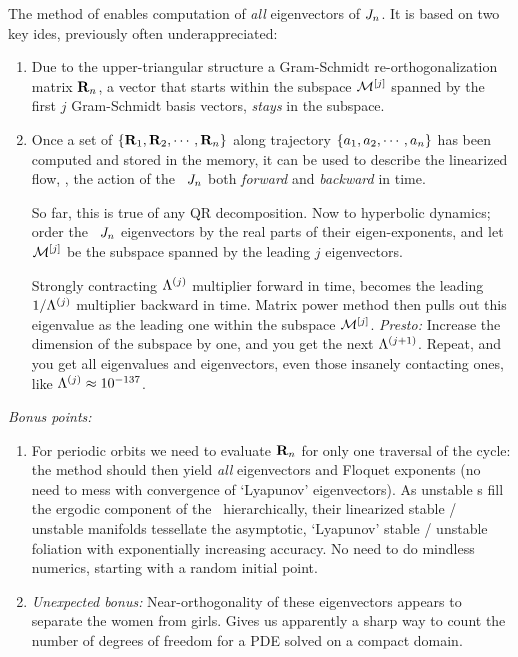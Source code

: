The method of  enables computation of
{\em all} eigenvectors of $J_n$. It is based on two key ides,
previously often underappreciated:
\begin{enumerate}
  \item
Due to the upper-triangular structure a Gram-Schmidt
  re-orthogonalization matrix ${\bf R}_n$, a vector that starts
  within the subspace ${\cal M}^{[j]}$ spanned by the first $j$ Gram-Schmidt
  basis vectors, {\em stays} in the subspace.
  \item
Once a set of $\{{\bf R}_1,{\bf R}_2,\cdots,{\bf R}_n\}$ along
trajectory $\{a_1,a_2,\cdots,a_n\}$ has been computed and
stored in the memory,
it can be used to describe the linearized flow,
\ie, the action of the \jacobianM\ $J_n$ both
\emph{forward} and \emph{backward} in time.

So far, this is true of any QR decomposition. Now to
hyperbolic dynamics; order the \jacobianM\ $J_n$
eigenvectors \jEigvec[\ell] by the real parts of their
eigen-exponents, and let ${\cal M}^{[j]}$ be the subspace spanned
by the leading $j$ eigenvectors.

Strongly contracting $\Lambda^{(j)}$ multiplier forward in time,
becomes the leading $1/\Lambda^{(j)}$ multiplier backward in time.
Matrix power method then pulls out this eigenvalue as the leading one
within the subspace ${\cal M}^{[j]}$. \emph{Presto:} Increase the dimension of the
subspace by one, and you get the next $\Lambda^{(j+1)}$. Repeat, and
you get all eigenvalues and eigenvectors, even those insanely contacting ones,
like $\Lambda^{(j)} \approx 10^{-137}$.

\end{enumerate}
\emph{Bonus points:}
\begin{enumerate}
  \item
For periodic orbits we need to evaluate ${\bf R}_n$
for only one traversal of the cycle: the method should then yield
{\em all} eigenvectors and Floquet exponents (no need to mess with
convergence of `Lyapunov' eigenvectors). As unstable \po s fill
the ergodic component of the \statesp\ hierarchically, their linearized
stable / unstable manifolds tessellate the asymptotic, `Lyapunov'
stable / unstable foliation with exponentially increasing accuracy.
No need to do mindless numerics, starting with a random initial point.

  \item
\emph{Unexpected bonus:}
Near-orthogonality of these eigenvectors appears to separate the women from
girls. Gives us apparently a sharp way to count the number of degrees of
freedom for a PDE solved on a compact domain.
\end{enumerate}

